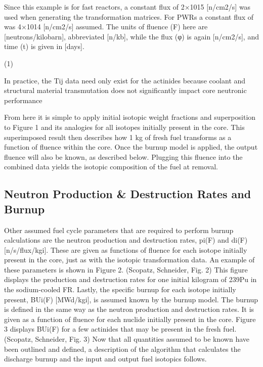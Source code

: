 Since this example is for fast reactors, a constant flux of 2×1015 [n/cm2/s] was used when generating the transformation matrices.  For PWRs a constant flux of was 4×1014 [n/cm2/s] assumed.  The units of fluence (F) here are [neutrons/kilobarn], abbreviated [n/kb], while the flux (φ) is again [n/cm2/s], and time (t) is given in [days].

                (1) 

In practice, the Tij data need only exist for the actinides because coolant and structural material transmutation does not significantly impact core neutronic performance  

From here it is simple to apply initial isotopic weight fractions and superposition to Figure 1 and its analogies for all isotopes initially present in the core.  This superimposed result then describes how 1 kg of fresh fuel transforms as a function of fluence within the core. Once the burnup model is applied, the output fluence will also be known, as described below.  Plugging this fluence into the combined data yields the isotopic composition of the fuel at removal. 



\subsection{Neutron Production & Destruction Rates and Burnup}
\label{1g_sec:pdbu}
Other assumed fuel cycle parameters that are required to perform burnup calculations are the neutron production and destruction rates, pi(F) and di(F) [n/s/flux/kgi].  These are given as functions of fluence for each isotope initially present in the core, just as with the isotopic transformation data.   An example of these parameters is shown in Figure 2.  
(Scopatz, Schneider, Fig. 2)
This figure displays the production and destruction rates for one initial kilogram of 239Pu in the sodium-cooled FR.   
Lastly, the specific burnup for each isotope initially present, BUi(F) [MWd/kgi], is assumed known by the burnup model.  The burnup is defined in the same way as the neutron production and destruction rates.  It is given as a function of fluence for each nuclide initially present in the core.  Figure 3 displays BUi(F) for a few actinides that may be present in the fresh fuel.
(Scopatz, Schneider, Fig. 3)
Now that all quantities assumed to be known have been outlined and defined, a description of the algorithm that calculates the discharge burnup and the input and output fuel isotopics follows.   





